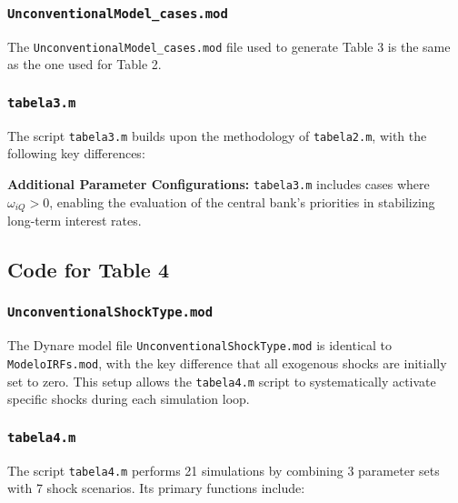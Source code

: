 \documentclass[12pt]{article}
\begin{document}
\subsubsection{\texttt{UnconventionalModel\_cases.mod}}

The \texttt{UnconventionalModel\_cases.mod} file used to generate Table 3 is the same as the one used for Table 2.


\subsubsection{\texttt{tabela3.m}}

The script \texttt{tabela3.m} builds upon the methodology of \texttt{tabela2.m}, with the following key differences:

\textbf{Additional Parameter Configurations:} \texttt{tabela3.m} includes cases where \(\omega_{iQ} > 0\), enabling the evaluation of the central bank’s priorities in stabilizing long-term interest rates.


\subsection{Code for Table 4}

\subsubsection{\texttt{UnconventionalShockType.mod}}

The Dynare model file \texttt{UnconventionalShockType.mod} is identical to \texttt{ModeloIRFs.mod}, with the key difference that all exogenous shocks are initially set to zero. This setup allows the \texttt{tabela4.m} script to systematically activate specific shocks during each simulation loop.

\subsubsection{\texttt{tabela4.m}}

The script \texttt{tabela4.m} performs 21 simulations by combining 3 parameter sets with 7 shock scenarios. Its primary functions include:
\end{document}
